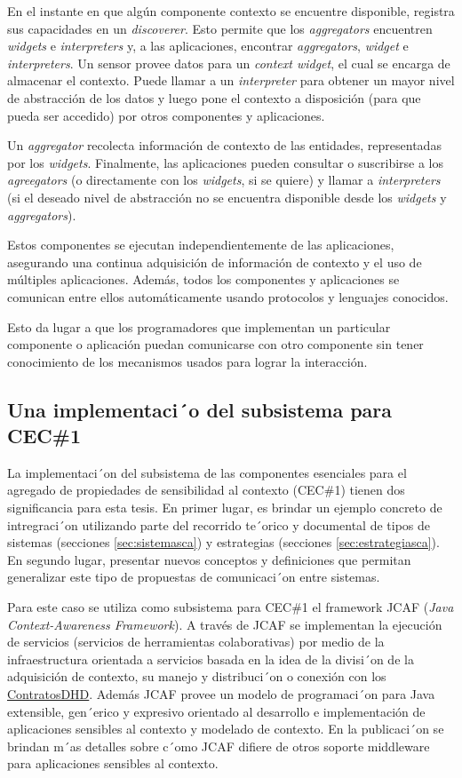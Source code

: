 En el instante en que algún componente contexto se encuentre disponible,
registra sus capacidades en un \textit{discoverer}. Esto permite que los
\textit{aggregators}
encuentren \textit{widgets} e \textit{interpreters} y, a las aplicaciones,
encontrar \textit{aggregators},
\textit{widget} e \textit{interpreters}. Un sensor provee datos para un
\textit{context widget}, el cual se encarga de almacenar el contexto. Puede
llamar a un \textit{interpreter} para obtener
un mayor nivel de abstracción de los datos y luego pone el contexto a
disposición (para que pueda ser accedido) por otros componentes y aplicaciones.

Un \textit{aggregator} recolecta información de contexto de las entidades,
representadas por los \textit{widgets}. Finalmente, las aplicaciones pueden
consultar o
suscribirse a los \textit{agreegators} (o directamente con los \textit{widgets},
si se quiere) y
llamar a \textit{interpreters} (si el deseado nivel de abstracción no se
encuentra
disponible desde los \textit{widgets} y \textit{aggregators}).

Estos componentes se ejecutan independientemente de las aplicaciones, asegurando
una continua adquisición de información de contexto y el uso de múltiples
aplicaciones. Además, todos los componentes y aplicaciones se comunican entre
ellos automáticamente usando protocolos y lenguajes conocidos.

Esto da lugar a que los programadores que implementan un particular componente o
aplicación puedan comunicarse con otro componente sin tener conocimiento de los
mecanismos usados para lograr la interacción.


\subsection{Una implementaci´o del subsistema para CEC\#1}

La implementaci´on del subsistema de las componentes esenciales para el
agregado de propiedades de sensibilidad al contexto (CEC\#1) tienen dos
significancia para esta tesis. En primer lugar, es brindar un ejemplo concreto
de intregraci´on utilizando parte del recorrido te´orico y documental
de tipos de sistemas (secciones \ref{sec:sistemasca})  y estrategias (secciones
\ref{sec:estrategiasca}). En segundo lugar, presentar nuevos conceptos y
definiciones que permitan generalizar este tipo de propuestas de comunicaci´on
entre sistemas. 

Para este caso se utiliza como subsistema para CEC\#1 el framework JCAF 
(\textit{Java Context-Awareness Framework}). A través de JCAF se implementan
la ejecución de servicios (servicios de herramientas colaborativas) por medio de
la infraestructura orientada a servicios basada en la idea de la divisi´on de la
adquisición de contexto, su manejo y  distribuci´on o conexión con los
\hyperref[contratosDHD]{ContratosDHD}. Además JCAF provee un modelo de
programaci´on para Java extensible, gen´erico y expresivo orientado al
desarrollo e implementación de aplicaciones sensibles al contexto y modelado
de contexto. En la  publicaci´on \cite{JCAF} se brindan m´as detalles sobre
c´omo JCAF difiere de otros soporte middleware para aplicaciones sensibles al
contexto. 


